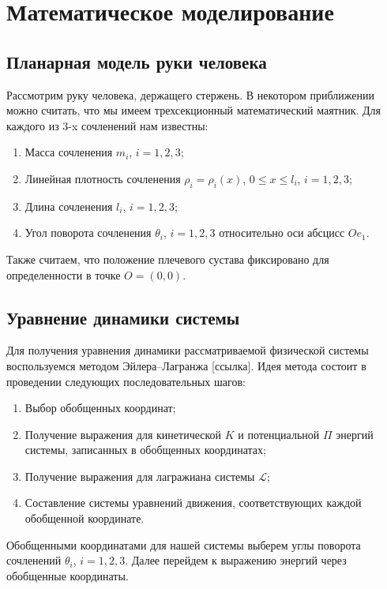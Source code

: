 \section{Математическое моделирование}

\subsection{Планарная модель руки человека}

Рассмотрим руку человека, держащего стержень.
В некотором приближении можно считать, что мы имеем трехсекционный математический маятник.
Для каждого из $3$-x сочленений нам известны:
\begin{enumerate}
    \item Масса сочленения $m_i$, $i=1,2,3$;
    \item Линейная плотность сочленения $\rho_i = \rho_i(x)$, $0 \leqslant x \leqslant l_i$, $i=1,2,3$;
    \item Длина сочленения $l_i$, $i=1,2,3$;
    \item Угол поворота сочленения $\theta_i$, $i=1,2,3$ относительно оси абсцисс $Oe_1$.
\end{enumerate}

Также считаем, что положение плечевого сустава фиксировано для определенности в точке $O = (0,0)$.

\subsection{Уравнение динамики системы}

Для получения уравнения динамики рассматриваемой физической системы воспользуемся методом Эйлера--Лагранжа [ссылка].
Идея метода состоит в проведении следующих последовательных шагов:
\begin{enumerate}
    \item Выбор обобщенных координат;
    \item Получение выражения для кинетической $K$ и потенциальной $\Pi$ энергий системы, записанных в обобщенных координатах;
    \item Получение выражения для лагражиана системы $\mathcal{L}$;
    \item Составление системы уравнений движения, соответствующих каждой обобщенной координате.
\end{enumerate}

Обобщенными координатами для нашей системы выберем углы поворота сочленений $\theta_i$, $i = 1, 2, 3$.
Далее перейдем к выражению энергий через обобщенные координаты.

